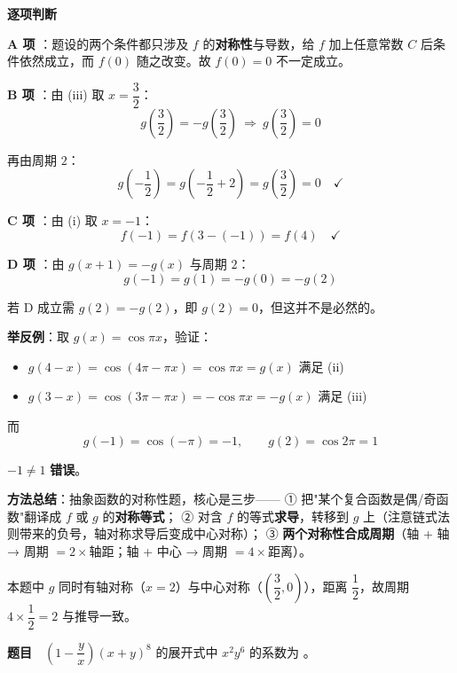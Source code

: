 \par\medskip

\textbf{逐项判断}

\textbf{A 项 }：题设的两个条件都只涉及 $f$ 的\textbf{对称性}与导数，给 $f$ 加上任意常数 $C$ 后条件依然成立，而 $f(0)$ 随之改变。故 $f(0)=0$ 不一定成立。

\textbf{B 项 }：由 (iii) 取 $x=\dfrac32$：
\[g\left(\frac32\right)=-g\left(\frac32\right)\ \Longrightarrow\ g\left(\frac32\right)=0\]

再由周期 $2$：
\[g\left(-\frac12\right)=g\left(-\frac12+2\right)=g\left(\frac32\right)=0\quad\checkmark\]

\textbf{C 项 }：由 (i) 取 $x=-1$：
\[f(-1)=f\left(3-(-1)\right)=f(4)\quad\checkmark\]

\textbf{D 项 }：由 $g(x+1)=-g(x)$ 与周期 $2$：
\[g(-1)=g(1)=-g(0)=-g(2)\]

若 D 成立需 $g(2)=-g(2)$，即 $g(2)=0$，但这并不是必然的。

\textbf{举反例}：取 $g(x)=\cos\pi x$，验证：
\begin{itemize}
\item $g(4-x)=\cos(4\pi-\pi x)=\cos\pi x=g(x)$  满足 (ii)
\item $g(3-x)=\cos(3\pi-\pi x)=-\cos\pi x=-g(x)$  满足 (iii)
\end{itemize}

而
\[g(-1)=\cos(-\pi)=-1,\qquad g(2)=\cos2\pi=1\]

$-1\ne1$  \textbf{错误}。


\begin{gktip}
\textbf{方法总结}：抽象函数的对称性题，核心是三步——
① 把"某个复合函数是偶/奇函数"翻译成 $f$ 或 $g$ 的\textbf{对称等式}；
② 对含 $f$ 的等式\textbf{求导}，转移到 $g$ 上（注意链式法则带来的负号，轴对称求导后变成中心对称）；
③ \textbf{两个对称性合成周期}（轴 + 轴 → 周期 $=2\times$轴距；轴 + 中心 → 周期 $=4\times$距离）。

本题中 $g$ 同时有轴对称（$x=2$）与中心对称（$\left(\dfrac32,0\right)$），距离 $\dfrac12$，故周期 $4\times\dfrac12=2$  与推导一致。
\end{gktip}

\par\medskip



\textbf{题目}　$\left(1-\dfrac yx\right)(x+y)^{8}$ 的展开式中 $x^{2}y^{6}$ 的系数为 \gkblank{}。

